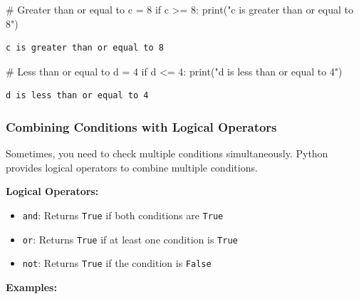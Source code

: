 \documentclass[
  letterpaper,
  DIV=11,
  numbers=noendperiod]{scrreprt}
\newenvironment{Shaded}{\begin{snugshade}}{\end{snugshade}}
\newcommand{\BuiltInTok}[1]{\textcolor[rgb]{0.00,0.23,0.31}{#1}}
\newcommand{\CommentTok}[1]{\textcolor[rgb]{0.37,0.37,0.37}{#1}}
\newcommand{\ControlFlowTok}[1]{\textcolor[rgb]{0.00,0.23,0.31}{#1}}
\newcommand{\DecValTok}[1]{\textcolor[rgb]{0.68,0.00,0.00}{#1}}
\newcommand{\NormalTok}[1]{\textcolor[rgb]{0.00,0.23,0.31}{#1}}
\newcommand{\OperatorTok}[1]{\textcolor[rgb]{0.37,0.37,0.37}{#1}}
\newcommand{\StringTok}[1]{\textcolor[rgb]{0.13,0.47,0.30}{#1}}
\providecommand{\tightlist}{%
  \setlength{\itemsep}{0pt}\setlength{\parskip}{0pt}}\usepackage{longtable,booktabs,array}
\begin{document}
\begin{Shaded}
\begin{Highlighting}[]
\CommentTok{\# Greater than or equal to}
\NormalTok{c }\OperatorTok{=} \DecValTok{8}
\ControlFlowTok{if}\NormalTok{ c }\OperatorTok{\textgreater{}=} \DecValTok{8}\NormalTok{:}
    \BuiltInTok{print}\NormalTok{(}\StringTok{"c is greater than or equal to 8"}\NormalTok{)}
\end{Highlighting}
\end{Shaded}

\begin{verbatim}
c is greater than or equal to 8
\end{verbatim}

\begin{Shaded}
\begin{Highlighting}[]
\CommentTok{\# Less than or equal to}
\NormalTok{d }\OperatorTok{=} \DecValTok{4}
\ControlFlowTok{if}\NormalTok{ d }\OperatorTok{\textless{}=} \DecValTok{4}\NormalTok{:}
    \BuiltInTok{print}\NormalTok{(}\StringTok{"d is less than or equal to 4"}\NormalTok{)}
\end{Highlighting}
\end{Shaded}

\begin{verbatim}
d is less than or equal to 4
\end{verbatim}

\hypertarget{combining-conditions-with-logical-operators}{%
\subsubsection{Combining Conditions with Logical
Operators}\label{combining-conditions-with-logical-operators}}

Sometimes, you need to check multiple conditions simultaneously. Python
provides logical operators to combine multiple conditions.

\textbf{Logical Operators:}

\begin{itemize}
\tightlist
\item
  \texttt{and}: Returns \texttt{True} if both conditions are
  \texttt{True}
\item
  \texttt{or}: Returns \texttt{True} if at least one condition is
  \texttt{True}
\item
  \texttt{not}: Returns \texttt{True} if the condition is \texttt{False}
\end{itemize}

\textbf{Examples:}
\end{document}
